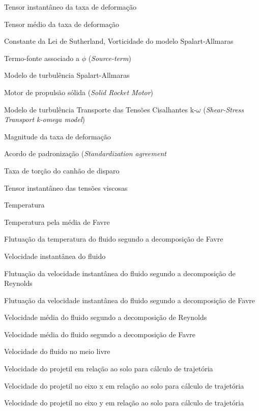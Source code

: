 \begin{siglas}
    \item[\(s_{ij}\)] Tensor instantâneo da taxa de deformação
    \item[\(S_{ij}\)] Tensor médio da taxa de deformação
    \item[\(S\)] Constante da Lei de Sutherland, Vorticidade do modelo Spalart-Allmaras
    \item[\(S_{\phi}\)] Termo-fonte associado a \(\phi\) (\textit{Source-term})
    \item[S-A] Modelo de turbulência Spalart-Allmaras
    \item[SRM] Motor de propulsão sólida (\textit{Solid Rocket Motor})
    \item[SST k-$\omega\)] Modelo de turbulência Transporte das Tensões Cisalhantes k-\(\omega\) (\textit{Shear-Stress Transport k-omega model})
    \item[\(S_t\)] Magnitude da taxa de deformação
    \item[STANAG] Acordo de padronização (\textit{Standardization agreement}
    \item[\(t_c\)] Taxa de torção do canhão de disparo
    \item[\(t_{ij}\)] Tensor instantâneo das tensões viscosas
    \item[\(T\)] Temperatura
    \item[\(\Tilde{T}\)] Temperatura pela média de Favre
    \item[\(T''\)] Flutuação da temperatura do fluido segundo a decomposição de Favre
    \item[\(u_i\)] Velocidade instantânea do fluido
    \item[\(u'_i\)] Flutuação da velocidade instantânea do fluido segundo a decomposição de Reynolds
    \item[\(u''_i\)] Flutuação da velocidade instantânea do fluido segundo a decomposição de Favre
    \item[\(U_i\)] Velocidade média do fluido segundo a decomposição de Reynolds
    \item[\(\Tilde{u}_i\)] Velocidade média do fluido segundo a decomposição de Favre
    \item[\(U_\infty\)] Velocidade do fluido no meio livre
    \item[\(U_{solo}\)] Velocidade do projetil em relação ao solo para cálculo de trajetória
    \item[\(U_{x_{solo}}\)] Velocidade do projetil no eixo x em relação ao solo para cálculo de trajetória
    \item[\(U_{y_{solo}}\)] Velocidade do projetil no eixo y em relação ao solo para cálculo de trajetória

\end{siglas}
